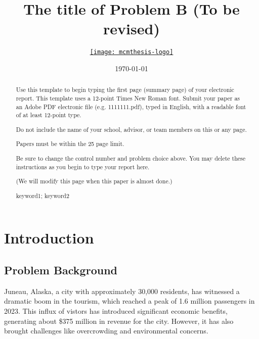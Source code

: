 \documentclass{mcmthesis}
\title{The title of Problem B (To be revised)}
\author{\small \href{https://www.latexstudio.net/}
  {\texttt{[image: mcmthesis-logo]}}}
\date{\today}
\begin{document}
\begin{abstract}
\par 
Use this template to begin typing the first page (summary page) of your electronic report. This template uses a 12-point Times New Roman font. Submit your paper as an Adobe PDF electronic file (e.g. 1111111.pdf), typed in English, with a readable font of at least 12-point type.

Do not include the name of your school, advisor, or team members on this or any page.

Papers must be within the 25 page limit.

Be sure to change the control number and problem choice above.
You may delete these instructions as you begin to type your report here.

(We will modify this page when this paper is almost done.)
\begin{keywords}
keyword1; keyword2
\end{keywords}
\end{abstract}
\maketitle
\tableofcontents
\newpage
\section{Introduction}
\subsection{Problem Background}
Juneau, Alaska, a city with approximately 30,000 residents, has witnessed
a dramatic boom in the tourism, which reached a peak of 1.6 million passengers
in 2023. This influx of vistors has introduced significant economic 
benefits, generating about \$375 million in revenue for the city. 
However, it has also brought challenges like overcrowding and 
environmental concerns.
\end{document}
